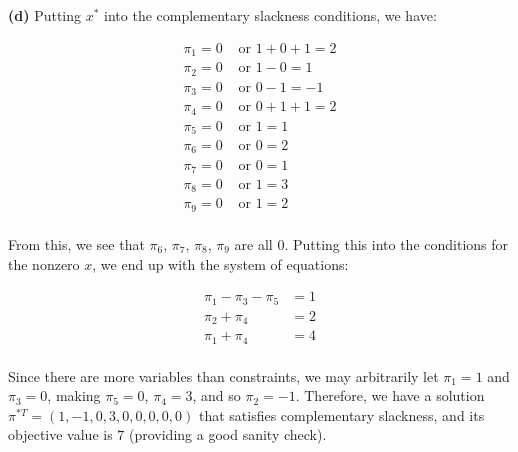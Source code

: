 \documentclass[fleqn]{homework}
\begin{document}
\begin{problem}{5}
    \textbf{(d)} Putting $x^*$ into the complementary slackness conditions, we
    have:

    \begin{align*}
      \pi_1 = 0 & \text{ or } 1 + 0 + 1 = 2 \\
      \pi_2 = 0 & \text{ or } 1 - 0 = 1 \\
      \pi_3 = 0 & \text{ or } 0 - 1 = -1 \\
      \pi_4 = 0 & \text{ or } 0 + 1 + 1 = 2 \\
      \pi_5 = 0 & \text{ or } 1 = 1 \\
      \pi_6 = 0 & \text{ or } 0 = 2 \\
      \pi_7 = 0 & \text{ or } 0 = 1 \\
      \pi_8 = 0 & \text{ or } 1 = 3 \\
      \pi_9 = 0 & \text{ or } 1 = 2 \\
    \end{align*}

    From this, we see that $\pi_6$, $\pi_7$, $\pi_8$, $\pi_9$ are all 0.
    Putting this into the conditions for the nonzero $x$, we end up with the
    system of equations:

    \begin{align*}
      \pi_1 - \pi_3 - \pi_5 &= 1 \\
      \pi_2 + \pi_4 &= 2 \\
      \pi_1 + \pi_4 &= 4 \\
    \end{align*}

    Since there are more variables than constraints, we may arbitrarily let
    $\pi_1 = 1$ and $\pi_3 = 0$, making $\pi_5 = 0$, $\pi_4 = 3$, and so
    $\pi_2 = -1$.  Therefore, we have a solution
    $\pi^{*T} = (1, -1, 0, 3, 0, 0, 0, 0, 0)$ that satisfies complementary
    slackness, and its objective value is $7$ (providing a good sanity check).
    
  \end{problem}
\end{document}
